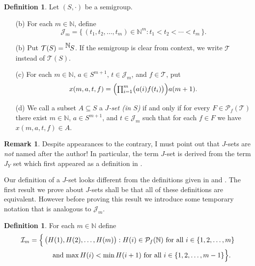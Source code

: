 \documentclass[12pt,showtrims]{memoir}
\theoremstyle{plain}
\theoremstyle{definition}
\newtheorem{defn}[thm]{Definition}
\newtheorem{rmk}[thm]{Remark}
\newcommand{\bbN}{\mathbb{N}}
\newcommand{\calI}{\mathcal{I}}
\newcommand{\calJ}{\mathcal{J}}
\newcommand{\calT}{\mathcal{T}}
\newcommand{\Pf}{\mathcal{P}_f}
\newcommand{\setfunc}[2]{\hbox{${}^{\hbox{$#1$}}\hskip -1 pt #2$}}
\begin{document}
\begin{defn}
  Let $(S, \cdot)$ be a semigroup.
  \begin{itemize}
    \item[(b)] 
      For each $m \in \bbN$, define
      \[
        \calJ_m = \{\, (t_1, t_2, \ldots, t_m) \in \bbN^m : t_1 < t_2 < \cdots < t_m \,\}.
      \]

    \item[(b)] 
      Put $\calT(S) = \setfunc{\bbN}{S}$.
      If the semigroup is clear from context, we write $\calT$ instead of $\calT(S)$.

    \item[(c)] 
      For each $m \in \bbN$, $a \in S^{m+1}$, $t \in \calJ_m$, and $f \in \calT$, put
      \[
        \textstyle
        x(m, a, t, f) = \Bigl( \prod_{i=1}^m \bigl( a(i)f(t_i) \bigr) \Bigr)a(m+1).
      \]

    \item[(d)] 
      We call a subset $A \subseteq S$ a \emph{$J$-set (in $S$)} if and only if for every $F \in \Pf(\calT)$ there exist $m \in \bbN$, $a \in S^{m+1}$, and $t \in \calJ_m$ such that for each $f \in F$ we have $x(m, a, t, f) \in A$.
  \end{itemize}
\end{defn}
\begin{rmk}
  Despite appearances to the contrary, I must point out that $J$-sets are \textsl{not} named after the author!
  In particular, the term $J$-set is derived from the term $J_Y$ set which first appeared as a definition in \cite[Definition 2.4(b)]{Hindman:1996fk}.
\end{rmk}

Our definition of a $J$-set looks different from the definitions given in \cite[Definition 2.2(a)]{Hindman:2009vn} and \cite[Definition 3.3(d)]{De:2008uq}.
The first result we prove about $J$-sets shall be that all of these definitions are equivalent.
However before proving this result we introduce some temporary notation that is analogous to $\calJ_m$.

\begin{defn}
  For each $m \in \bbN$ define
  \begin{align*}
    \calI_m &= \Bigl\{\, \bigl( H(1), H(2), \ldots, H(m) \bigr) : \hbox{$H(i) \in \mathcal{P}_f(\bbN)$ for all $i \in \{1, 2, \ldots, m\}$} \\
        &\hspace{3em} \hbox{ and $\max H(i) < \min H(i+1)$ for all $i \in \{1, 2, \ldots, m-1\}$} \Bigr\}.
  \end{align*}
\end{defn}
\end{document}
